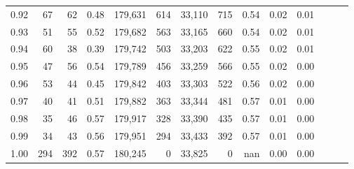 \begin{tabular}{rrrrrrrrrrrrrr}
0.92 &     67 &   62 &  0.48 &  179,631 &      614 &  33,110 &     715 &  0.54 &  0.02 &      0.01 \\
0.93 &     51 &   55 &  0.52 &  179,682 &      563 &  33,165 &     660 &  0.54 &  0.02 &      0.01 \\
0.94 &     60 &   38 &  0.39 &  179,742 &      503 &  33,203 &     622 &  0.55 &  0.02 &      0.01 \\
0.95 &     47 &   56 &  0.54 &  179,789 &      456 &  33,259 &     566 &  0.55 &  0.02 &      0.00 \\
0.96 &     53 &   44 &  0.45 &  179,842 &      403 &  33,303 &     522 &  0.56 &  0.02 &      0.00 \\
0.97 &     40 &   41 &  0.51 &  179,882 &      363 &  33,344 &     481 &  0.57 &  0.01 &      0.00 \\
0.98 &     35 &   46 &  0.57 &  179,917 &      328 &  33,390 &     435 &  0.57 &  0.01 &      0.00 \\
0.99 &     34 &   43 &  0.56 &  179,951 &      294 &  33,433 &     392 &  0.57 &  0.01 &      0.00 \\
1.00 &    294 &  392 &  0.57 &  180,245 &        0 &  33,825 &       0 &   nan &  0.00 &      0.00 \\
\bottomrule
\end{tabular}
